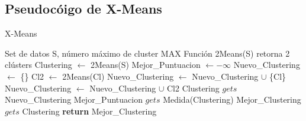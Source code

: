 \subsection{Pseudocóigo de X-Means}

\begin{algorithm}
\caption{X-Means}\label{alg:xmeans}
\begin{algorithmic}[1]
\Require Set de datos S, número máximo de cluster MAX
\Require Función 2Means(S) retorna 2 clústers
\State Clustering $\gets$ 2Means(S)
\State Mejor\_Puntuacion $\gets -\infty$ 
\State Nuevo\_Clustering $\gets$ \{\}
\State Cl2 $\gets$ 2Means(Cl)
\State Nuevo\_Clustering $\gets$ Nuevo\_Clustering $ \cup $ \{Cl\}
\Else
\State Nuevo\_Clustering $\gets$ Nuevo\_Clustering $ \cup $ Cl2
\EndIf
\EndFor
\State Clustering $gets$ Nuevo\_Clustering
\State Mejor\_Puntuacion $gets$ Medida(Clustering)
\State Mejor\_Clustering $gets$ Clustering
\EndIf
\EndWhile\label{euclidendwhile}
\State \textbf{return} Mejor\_Clustering 
\end{algorithmic}
\end{algorithm}

